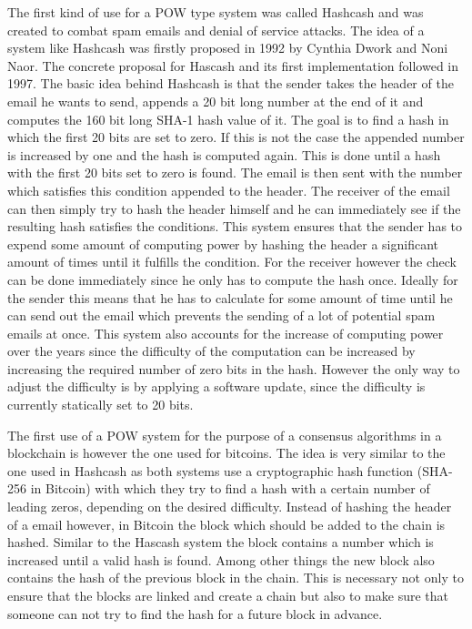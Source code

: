 The first kind of use for a POW type system was called Hashcash\cite{url:hashcash} and was created to combat spam emails and denial of service attacks. The idea of a system like Hashcash was firstly
proposed in 1992 by Cynthia Dwork and Noni Naor.\cite{url:pow_email} The concrete proposal for Hascash and its first implementation followed in 1997.\cite{url:hashcash} The basic idea behind Hashcash
is that the sender takes the header of the email he wants to send, appends a 20 bit long number at the end of it and computes the 160 bit long SHA-1 hash value of it. The goal is to find a hash in
which the first 20 bits are set to zero. If this is not the case the appended number is increased by one and the hash is computed again. This is done until a hash with the first 20 bits set to zero is
found. The email is then sent with the number which satisfies this condition appended to the header. The receiver of the email can then simply try to hash the header himself and he can immediately see
if the resulting hash satisfies the conditions. This system ensures that the sender has to expend some amount of computing power by hashing the header a significant amount of times until it fulfills
the condition. For the receiver however the check can be done immediately since he only has to compute the hash once. Ideally for the sender this means that he has to calculate for some amount of time
until he can send out the email which prevents the sending of a lot of potential spam emails at once. This system also accounts for the increase of computing power over the years since the difficulty
of the computation can be increased by increasing the required number of zero bits in the hash. However the only way to adjust the difficulty is by applying a software update, since the difficulty is
currently statically set to 20 bits.\par The first use of a POW system for the purpose of a consensus algorithms in a blockchain is however the one used for bitcoins. The idea is very similar to the
one used in Hashcash as both systems use a cryptographic hash function (SHA-256 in Bitcoin) with which they try to find a hash with a certain number of leading zeros, depending on the desired
difficulty. Instead of hashing the header of a email however, in Bitcoin the block which should be added to the chain is hashed. Similar to the Hascash system the block contains a number which is
increased until a valid hash is found. Among other things the new block also contains the hash of the previous block in the chain. This is necessary not only to ensure that the blocks are linked and
create a chain but also to make sure that someone can not try to find the hash for a future block in advance. 

